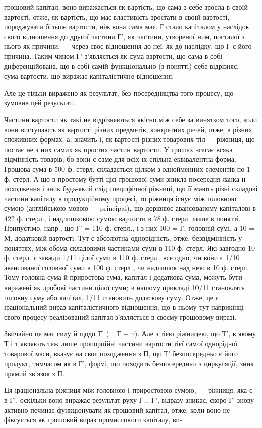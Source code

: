 грошовий капітал, воно виражається як вартість, що сама з себе зросла
в своїй вартості, отже, як вартість, що має властивість зростати в своїй
вартості, породжувати більше вартости, ніж вона сама має. Г стало капіталом
у наслідок свого відношення до другої частини Г', як частини,
утвореної ним, посталої з нього як причини, — через своє відношення до
неї, як до наслідку, що Г є його причина. Таким чином Г' з’являється
як сума вартости, що сама в собі диференційована, що в собі самій функціонально
(в понятті) себе відрізняє, — сума вартости, що виражає капіталістичне
відношення.

Але це тільки виражено як результат, без посередництва того процесу,
що зумовив цей результат.

Частини вартости як такі не відрізняються якісно між себе за винятком
того, коли вони виступають як вартості різних предметів, конкретних
речей, отже, в різних споживних формах, а, значить і, як вартості
різних товарових тіл — ріжниця, що постає не з них самих як простих
частин вартости. У грошах згасає всяка відмінність товарів, бо вони є
саме для всіх їх спільна еквівалентна форма. Грошова сума в 500 ф.
стерл. складається цілком з однойменних елементів по 1 ф. стерл. А що
в простому бутті цієї грошової суми зникла посередня ланка її походження
і зник будь-який слід специфічної ріжниці, що її мають різні
складові частини капіталу в продукційному процесі, то ріжниця існує
між головною сумою (англійською мовою — principal), що дорівнює
авансованому капіталові в 422 ф. стерл., і надлишковою сумою вартости
в 78 ф. стерл. лише в понятті. Припустімо, напр., що Г' = 110 ф. стерл.,
і з них 100 = Г, головній сумі, а 10 = М, додатковій вартості. Тут
є абсолютна однорідність, отже, безвідмінність у поняттях, між обома
складовими частинами суми в 110 ф. стерл. Які завгодно 10 ф. стерл.
є завжди 1/11 цілої суми в 110 ф. стерл., все одно, чи вони є 1/10 авансованої
головної суми в 100 ф. стерл., чи надлишок над нею в 10 ф. стерл.
Тому головна сума й приростова сума, капітал і додаткова сума, можуть
бути виражені як дробові частини цілої суми; в нашому прикладі 10/11 становлять
головну суму або капітал, 1/11 становить додаткову суму. Отже, це є
іраціональний вираз капіталістичного відношення, що в ньому тут наприкінці
свого процесу реалізований капітал з’язляється в своєму грошовому виразі.

Звичайно це має силу й щодо Т' (= Т + т). Але з тією ріжницею, що
Т', в якому Т і т являють теж лише пропорційні частини вартости тієї
самої однорідної товарової маси, вказує на своє походження з П, що Т'
безпосередньо є його продукт, тимчасом як в Г', формі, що походить
безпосередньо з циркуляції, зник прямий зв’язок з П.

Ця іраціональна ріжниця між головною і приростовою сумою, — ріжниця,
яка є в Г', оскільки воно виражає результат руху Г... Г', відразу зникає,
скоро Г' знову активно починає функціонувати як грошовий капітал, отже,
коли воно не фіксується як грошовий вираз промислового капіталу, ви-
